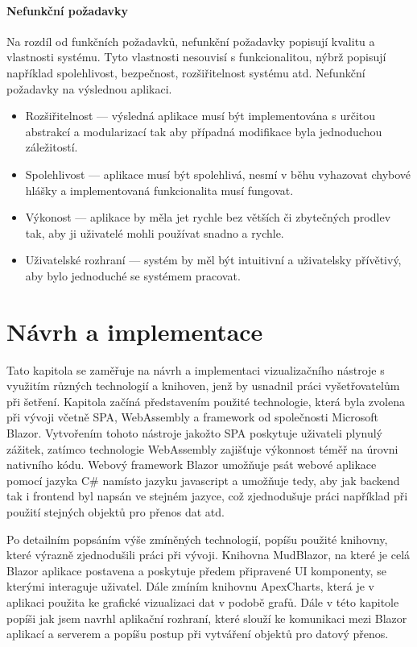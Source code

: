\subsubsection*{Nefunkční požadavky}
Na rozdíl od funkčních požadavků, nefunkční požadavky popisují kvalitu a vlastnosti systému. Tyto vlastnosti nesouvisí s funkcionalitou, nýbrž popisují například spolehlivost, bezpečnost, rozšiřitelnost systému atd. Nefunkční požadavky na výslednou aplikaci.

\begin{itemize}
    \item Rozšiřitelnost --- výsledná aplikace musí být implementována s určitou abstrakcí a modularizací tak aby případná modifikace byla jednoduchou záležitostí.
    \item Spolehlivost --- aplikace musí být spolehlivá, nesmí v běhu vyhazovat chybové hlášky a implementovaná funkcionalita musí fungovat. 
    \item Výkonost --- aplikace by měla jet rychle bez větších či zbytečných prodlev tak, aby ji uživatelé mohli používat snadno a rychle.
    \item Uživatelské rozhraní --- systém by měl být intuitivní a uživatelsky přívětivý, aby bylo jednoduché se systémem pracovat.
\end{itemize}


\chapter{Návrh a implementace}

Tato kapitola se zaměřuje na návrh a implementaci vizualizačního nástroje s využitím různých technologií a knihoven, jenž by usnadnil práci vyšetřovatelům při šetření. Kapitola začíná představením použité technologie, která byla zvolena při vývoji včetně \gls{SPA}, WebAssembly a framework od společnosti Microsoft Blazor. Vytvořením tohoto nástroje jakožto \gls{SPA} poskytuje uživateli plynulý zážitek, zatímco technologie WebAssembly zajišťuje výkonnost téměř na úrovni nativního kódu. Webový framework Blazor umožňuje psát webové aplikace pomocí jazyka C\# namísto jazyku javascript a umožňuje tedy, aby jak backend tak i frontend byl napsán ve stejném jazyce, což zjednodušuje práci například při použití stejných objektů pro přenos dat atd.

Po detailním popsáním výše zmíněných technologií, popíšu použité knihovny, které výrazně zjednodušili práci při vývoji. Knihovna MudBlazor, na které je celá Blazor aplikace postavena a poskytuje předem připravené UI komponenty, se kterými interaguje uživatel. Dále zmíním knihovnu ApexCharts, která je v aplikaci použita ke grafické vizualizaci dat v podobě grafů. Dále v této kapitole popíši jak jsem navrhl aplikační rozhraní, které slouží ke komunikaci mezi Blazor aplikací a serverem a popíšu postup při vytváření objektů pro datový přenos.

